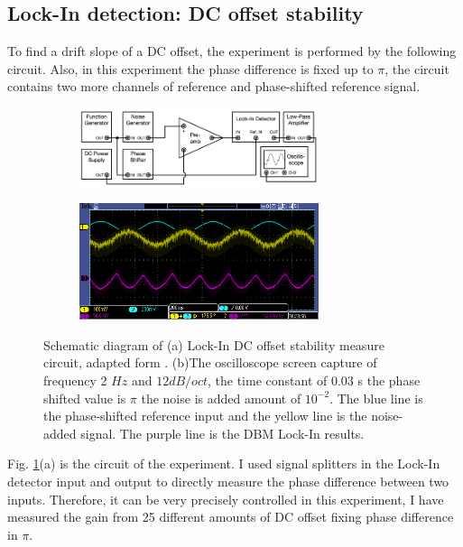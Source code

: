 \documentclass{article}
\begin{document}
\subsection{Lock-In detection: DC offset stability}
 To find a drift slope of a DC offset, the experiment is performed by the following circuit.
 Also, in this experiment the phase difference is fixed up to $\pi$, the circuit contains two more channels of reference and phase-shifted reference signal.
 \begin{figure}[H]
    \centering
    \begin{subfigure}[b]{7cm}
        \centering
        \includegraphics[width=7cm]{../results/DC_off_set_circuit.png}
        \caption{}
    \end{subfigure}
    \hfill
    \begin{subfigure}[b]{7cm}
        \centering
        \includegraphics[width=7cm]{../raw_data/TEK00640.PNG}
        \caption{}
    \end{subfigure}
    \hfill
    \caption{Schematic diagram of (a) Lock-In DC offset stability measure circuit, adapted form  \cite{signal_processor}.
    (b)The oscilloscope screen capture of frequency 2 $Hz$ and $12 dB/oct$, the time constant of $0.03$ s the phase shifted value is $\pi$ the noise is added amount of $10^{-2}$.
    The blue line is the phase-shifted reference input and the yellow line is the noise-added signal.
    The purple line is the DBM Lock-In results.
    }
    \label{fig: DC_off_set_circuit}
  \end{figure}
 Fig. \ref{fig: DC_off_set_circuit}(a) is the circuit of the experiment.
 I used signal splitters in the Lock-In detector input and output to directly measure the phase difference between two inputs.
 Therefore, it can be very precisely controlled in this experiment, I have measured the gain from 25 different amounts of DC offset fixing phase difference in $\pi$.
\end{document}
